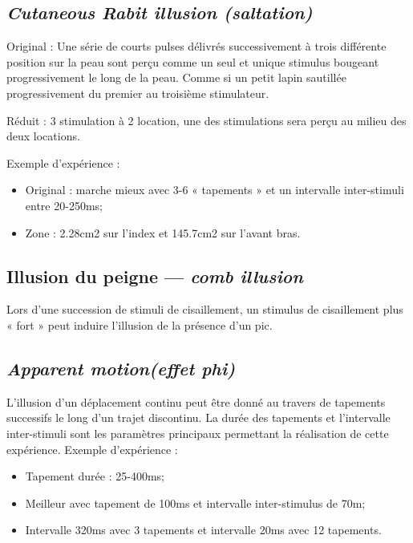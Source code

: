 \subsection{ \textit{Cutaneous Rabit illusion (saltation)}}
Original : Une série de courts pulses délivrés successivement à trois différente position sur la peau sont perçu comme un seul et unique stimulus bougeant progressivement le long de la peau. Comme si un petit lapin sautillée progressivement du premier au troisième stimulateur.\par
Réduit : 3 stimulation à 2 location, une des stimulations sera perçu au milieu des deux locations.\par
Exemple d’expérience :
\begin{itemize}
	\item Original : marche mieux avec 3-6 « tapements » et un intervalle inter-stimuli entre 20-250ms;
	\item Zone : 2.28cm2 sur l’index et 145.7cm2 sur l’avant bras.
\end{itemize}

\subsection{Illusion du peigne --- \textit{comb illusion}}
Lors d’une succession de stimuli de cisaillement, un stimulus de cisaillement plus « fort » peut induire l’illusion de la présence d’un pic.\par

\subsection{\textit{Apparent motion(effet phi)}}
L’illusion d’un déplacement continu peut être donné au travers de tapements successifs le long d’un trajet discontinu. La durée des tapements et l’intervalle inter-stimuli sont les paramètres principaux permettant la réalisation de cette expérience. Exemple d’expérience :
\begin{itemize}
	\item Tapement durée : 25-400ms;
	\item Meilleur avec tapement de 100ms et intervalle inter-stimulus de 70m;
	\item Intervalle 320ms avec 3 tapements et intervalle 20ms avec 12 tapements.
\end{itemize}


